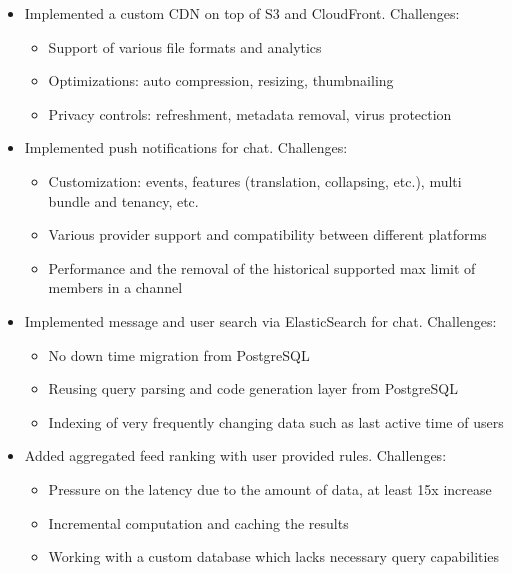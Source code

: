 \documentclass[line, margin]{res}
\begin{document}
\begin{resume}
\begin{itemize}
	\item{Implemented a custom CDN on top of S3 and CloudFront. Challenges:}
		\begin{itemize} \itemsep -5pt \small
		\vspace{-.2cm}
		\item Support of various file formats and analytics
		\item Optimizations: auto compression, resizing, thumbnailing
		\item Privacy controls: refreshment, metadata removal, virus protection
		\end{itemize}
	
	\item{Implemented push notifications for chat. Challenges:}
		\begin{itemize} \itemsep -5pt \small
		\vspace{-.2cm}
		\item Customization: events, features (translation, collapsing, etc.), multi bundle and tenancy, etc.
		\item Various provider support and compatibility between different platforms
		\item Performance and the removal of the historical supported max limit of members in a channel
		\end{itemize}
		
	\item{Implemented message and user search via ElasticSearch for chat. Challenges:}
		\begin{itemize} \itemsep -5pt \small
		\vspace{-.2cm}
		\item No down time migration from PostgreSQL
		\item Reusing query parsing and code generation layer from PostgreSQL
		\item Indexing of very frequently changing data such as last active time of users
		\end{itemize}
	
	\item{Added aggregated feed ranking with user provided rules. Challenges:}
		\begin{itemize} \itemsep -5pt \small
		\vspace{-.2cm}
		\item Pressure on the latency due to the amount of data, at least 15x increase
		\item Incremental computation and caching the results
		\item Working with a custom database which lacks necessary query capabilities
		\end{itemize}
		

\end{itemize}
\end{resume}
\end{document}
